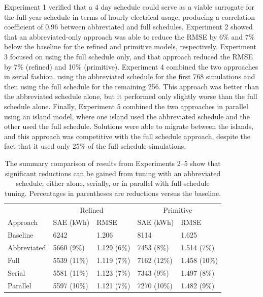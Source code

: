 \documentclass[preprint, review, 12pt]{elsarticle}
\begin{document}
Experiment 1 verified that a 4 day schedule could serve as a viable surrogate for the full-year schedule in terms of hourly electrical usage, producing a correlation coefficient of 0.96 between abbreviated and full schedules. Experiment 2 showed that an abbreviated-only approach was able to reduce the RMSE by 6\% and 7\% below the baseline for the refined and primitive models, respectively. Experiment 3 focused on using the full schedule only, and that approach reduced the RMSE by 7\% (refined) and 10\% (primitive). Experiment 4 combined the two approaches in serial fashion, using the abbreviated schedule for the first 768 simulations and then using the full schedule for the remaining 256. This approach was better than the abbreviated schedule alone, but it performed only slightly worse than the full schedule alone. Finally, Experiment 5 combined the two approaches in parallel using an island model, where one island used the abbreviated schedule and the other used the full schedule. Solutions were able to migrate between the islands, and this approach was competitive with the full schedule approach, despite the fact that it used only 25\% of the full-schedule simulations.


\begin{table}[htbp]
\centering
\caption{The summary comparison of results from Experiments 2--5 show that significant reductions can be gained from tuning with an abbreviated schedule, either alone, serially, or in parallel with full-schedule tuning. Percentages in parentheses are reductions versus the baseline.}
\label{tab:hourly-summary}
\begin{tabular}{lllll}
\toprule
 &  \multicolumn{2}{c}{Refined} & \multicolumn{2}{c}{Primitive}\\
Approach & SAE (kWh) & RMSE & SAE (kWh) & RMSE \\
\midrule
Baseline    & 6242        & 1.206       & 8114        & 1.625 \\\rowcolor{DarkRow}
Abbreviated & 5660 (9\%)  & 1.129 (6\%) & 7453 (8\%)  & 1.514 (7\%)\\
Full        & 5539 (11\%) & 1.119 (7\%) & 7162 (12\%) & 1.458 (10\%)\\\rowcolor{DarkRow}
Serial      & 5581 (11\%) & 1.123 (7\%) & 7343 (9\%)  & 1.497 (8\%)\\
Parallel    & 5597 (10\%) & 1.121 (7\%) & 7270 (10\%) & 1.482 (9\%)\\
\bottomrule
\end{tabular}
\end{table}
\end{document}
